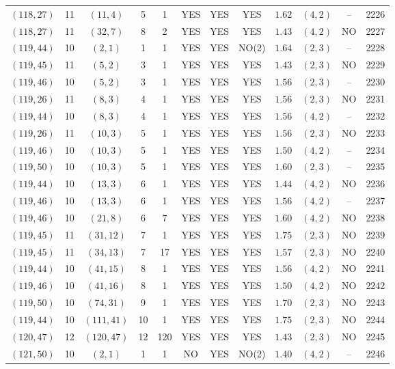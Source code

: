 \begin{longtable}{|c|c|c|c|c|c|c|c|c|c|c|c|}
$(118,27)$ & 11 & $(11,4)$ & 5 & 1 & YES & YES & YES & $1.62$ & $(4,2)$ & -- & 2226\\
$(118,27)$ & 11 & $(32,7)$ & 8 & 2 & YES & YES & YES & $1.43$ & $(4,2)$ & NO & 2227\\
$(119,44)$ & 10 & $(2,1)$ & 1 & 1 & YES & YES & NO(2) & $1.64$ & $(2,3)$ & -- & 2228\\
$(119,45)$ & 11 & $(5,2)$ & 3 & 1 & YES & YES & YES & $1.43$ & $(2,3)$ & NO & 2229\\
$(119,46)$ & 10 & $(5,2)$ & 3 & 1 & YES & YES & YES & $1.56$ & $(2,3)$ & -- & 2230\\
$(119,26)$ & 11 & $(8,3)$ & 4 & 1 & YES & YES & YES & $1.56$ & $(2,3)$ & NO & 2231\\
$(119,44)$ & 10 & $(8,3)$ & 4 & 1 & YES & YES & YES & $1.56$ & $(4,2)$ & -- & 2232\\
$(119,26)$ & 11 & $(10,3)$ & 5 & 1 & YES & YES & YES & $1.56$ & $(2,3)$ & NO & 2233\\
$(119,46)$ & 10 & $(10,3)$ & 5 & 1 & YES & YES & YES & $1.50$ & $(4,2)$ & -- & 2234\\
$(119,50)$ & 10 & $(10,3)$ & 5 & 1 & YES & YES & YES & $1.60$ & $(2,3)$ & -- & 2235\\
$(119,44)$ & 10 & $(13,3)$ & 6 & 1 & YES & YES & YES & $1.44$ & $(4,2)$ & NO & 2236\\
$(119,46)$ & 10 & $(13,3)$ & 6 & 1 & YES & YES & YES & $1.56$ & $(4,2)$ & -- & 2237\\
$(119,46)$ & 10 & $(21,8)$ & 6 & 7 & YES & YES & YES & $1.60$ & $(4,2)$ & NO & 2238\\
$(119,45)$ & 11 & $(31,12)$ & 7 & 1 & YES & YES & YES & $1.75$ & $(2,3)$ & NO & 2239\\
$(119,45)$ & 11 & $(34,13)$ & 7 & 17 & YES & YES & YES & $1.57$ & $(2,3)$ & NO & 2240\\
$(119,44)$ & 10 & $(41,15)$ & 8 & 1 & YES & YES & YES & $1.56$ & $(4,2)$ & NO & 2241\\
$(119,46)$ & 10 & $(41,16)$ & 8 & 1 & YES & YES & YES & $1.50$ & $(4,2)$ & NO & 2242\\
$(119,50)$ & 10 & $(74,31)$ & 9 & 1 & YES & YES & YES & $1.70$ & $(2,3)$ & NO & 2243\\
$(119,44)$ & 10 & $(111,41)$ & 10 & 1 & YES & YES & YES & $1.75$ & $(2,3)$ & NO & 2244\\
$(120,47)$ & 12 & $(120,47)$ & 12 & 120 & YES & YES & YES & $1.43$ & $(2,3)$ & NO & 2245\\
$(121,50)$ & 10 & $(2,1)$ & 1 & 1 & NO & YES & NO(2) & $1.40$ & $(4,2)$ & -- & 2246\\

\end{longtable}
